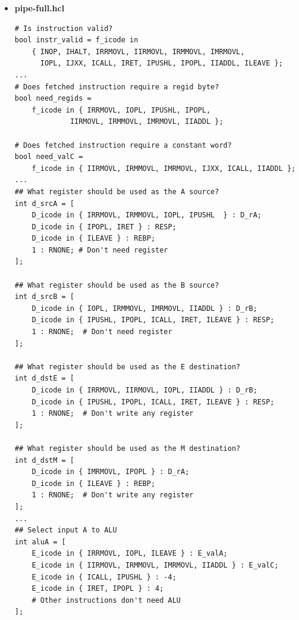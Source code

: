 \documentclass{article}
\begin{document}
\begin{itemize}
\begin{lstlisting}
  jle N28                 # if so, goto N28:
  iaddl $1, %eax          # count++
N28: andl %edi, %edi      # val <= 0?  
  jle N29                 # if so, goto N29:
  iaddl $1, %eax          # count++
N29:
  mrmovl 56(%ebx), %esi   # read val from src...
  mrmovl 60(%ebx), %edi
  rmmovl %esi, 56(%ecx)   # ...and store it to dst    
  rmmovl %edi, 60(%ecx)  
  andl %esi, %esi         # val <= 0?  
  jle N30                 # if so, goto N30:
  iaddl $1, %eax          # count++
N30: andl %edi, %edi      # val <= 0?  
  jle N31                 # if so, goto N31:
  iaddl $1, %eax          # count++
N31: iaddl $64, %ebx      # src+=16
  iaddl $64, %ecx         # dst+=16
  iaddl $-16, %edx        # len-=8 > 0?
  jg Hexm                 # if so, goto Hexm.
##################################################################
# Do not modify the following section of code
# Function epilogue.
Done:
  popl %edi       # Restore callee-save registers
  popl %ebx
  popl %esi
  leave
  ret
		\end{lstlisting}
	\item \textbf{pipe-full.hcl}

\begin{lstlisting}
# Is instruction valid?
bool instr_valid = f_icode in
	{ INOP, IHALT, IRRMOVL, IIRMOVL, IRMMOVL, IMRMOVL,
	  IOPL, IJXX, ICALL, IRET, IPUSHL, IPOPL, IIADDL, ILEAVE };
...
# Does fetched instruction require a regid byte?
bool need_regids =
	f_icode in { IRRMOVL, IOPL, IPUSHL, IPOPL, 
		     IIRMOVL, IRMMOVL, IMRMOVL, IIADDL };

# Does fetched instruction require a constant word?
bool need_valC =
	f_icode in { IIRMOVL, IRMMOVL, IMRMOVL, IJXX, ICALL, IIADDL };
...
## What register should be used as the A source?
int d_srcA = [
	D_icode in { IRRMOVL, IRMMOVL, IOPL, IPUSHL  } : D_rA;
	D_icode in { IPOPL, IRET } : RESP;
	D_icode in { ILEAVE } : REBP;
	1 : RNONE; # Don't need register
];

## What register should be used as the B source?
int d_srcB = [
	D_icode in { IOPL, IRMMOVL, IMRMOVL, IIADDL } : D_rB;
	D_icode in { IPUSHL, IPOPL, ICALL, IRET, ILEAVE } : RESP;
	1 : RNONE;  # Don't need register
];

## What register should be used as the E destination?
int d_dstE = [
	D_icode in { IRRMOVL, IIRMOVL, IOPL, IIADDL } : D_rB;
	D_icode in { IPUSHL, IPOPL, ICALL, IRET, ILEAVE } : RESP;
	1 : RNONE;  # Don't write any register
];

## What register should be used as the M destination?
int d_dstM = [
	D_icode in { IMRMOVL, IPOPL } : D_rA;
	D_icode in { ILEAVE } : REBP;
	1 : RNONE;  # Don't write any register
];
...
## Select input A to ALU
int aluA = [
	E_icode in { IRRMOVL, IOPL, ILEAVE } : E_valA;
	E_icode in { IIRMOVL, IRMMOVL, IMRMOVL, IIADDL } : E_valC;
	E_icode in { ICALL, IPUSHL } : -4;
	E_icode in { IRET, IPOPL } : 4;
	# Other instructions don't need ALU
];


\end{lstlisting}
\end{itemize}
\end{document}
